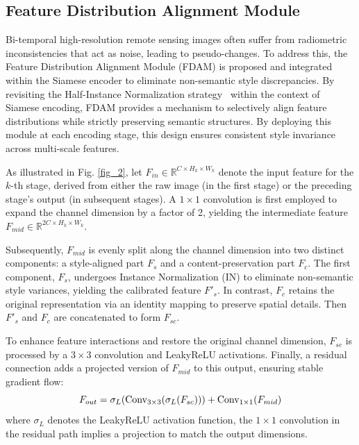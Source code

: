 \documentclass[lettersize,journal]{IEEEtran}
\begin{document}
\vspace{-5pt}
\subsection{Feature Distribution Alignment Module}
Bi-temporal high-resolution remote sensing images often suffer from radiometric inconsistencies that act as noise, leading to pseudo-changes. To address this, the Feature Distribution Alignment Module (FDAM) is proposed and integrated within the Siamese encoder to eliminate non-semantic style discrepancies. By revisiting the Half-Instance Normalization strategy~\cite{chen2021hinet} within the context of Siamese encoding, FDAM provides a mechanism to selectively align feature distributions while strictly preserving semantic structures. By deploying this module at each encoding stage, this design ensures consistent style invariance across multi-scale features.

As illustrated in Fig. \ref{fig_2}, let $F_{in} \in \mathbb{R}^{C \times H_k \times W_k}$ denote the input feature for the $k$-th stage, derived from either the raw image (in the first stage) or the preceding stage's output (in subsequent stages). A $1\times1$ convolution is first employed to expand the channel dimension by a factor of 2, yielding the intermediate feature $F_{mid} \in \mathbb{R}^{2C \times H_k \times W_k}$.

Subsequently, $F_{mid}$ is evenly split along the channel dimension into two distinct components: a style-aligned part $F_s$ and a content-preservation part $F_c$. The first component, $F_s$, undergoes Instance Normalization (IN) to eliminate non-semantic style variances, yielding the calibrated feature $F'_{s}$. In contrast, $F_c$ retains the original representation via an identity mapping to preserve spatial details. Then $F'_{s}$ and $F_{c}$ are concatenated to form $F_{sc}$.

To enhance feature interactions and restore the original channel dimension, $F_{sc}$ is processed by a $3\times3$ convolution and LeakyReLU activations. Finally, a residual connection adds a projected version of $F_{mid}$ to this output, ensuring stable gradient flow:
\vspace{-5pt}
\begin{equation}
\label{deqn_Fout}
F_{out} = \sigma_{L}(\text{Conv}_{3\times3}(\sigma_{L}(F_{sc}))) + \text{Conv}_{1\times1}(F_{mid})
\vspace{-5pt}
\end{equation}
where $\sigma_{L}$ denotes the LeakyReLU activation function, the $1\times1$ convolution in the residual path implies a projection to match the output dimensions.
\end{document}
